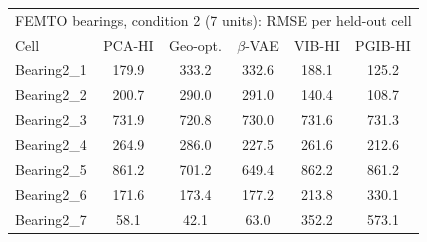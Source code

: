 \begin{tabular}{l c c c c c}
\hline
\multicolumn{6}{l}{FEMTO bearings, condition 2 (7 units): RMSE per held-out cell}\\
 Cell & PCA-HI & Geo-opt. & $\beta$-VAE & VIB-HI & PGIB-HI \\
\hline
Bearing2\_1 & 179.9 & 333.2 & 332.6 & 188.1 & 125.2 \\
Bearing2\_2 & 200.7 & 290.0 & 291.0 & 140.4 & 108.7 \\
Bearing2\_3 & 731.9 & 720.8 & 730.0 & 731.6 & 731.3 \\
Bearing2\_4 & 264.9 & 286.0 & 227.5 & 261.6 & 212.6 \\
Bearing2\_5 & 861.2 & 701.2 & 649.4 & 862.2 & 861.2 \\
Bearing2\_6 & 171.6 & 173.4 & 177.2 & 213.8 & 330.1 \\
Bearing2\_7 & 58.1 & 42.1 & 63.0 & 352.2 & 573.1 \\
\hline
\end{tabular}
